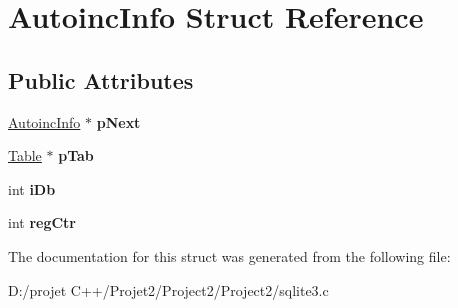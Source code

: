 \hypertarget{struct_autoinc_info}{}\section{Autoinc\+Info Struct Reference}
\label{struct_autoinc_info}
\subsection*{Public Attributes}
\begin{DoxyCompactItemize}
\item 
\mbox{\label{struct_autoinc_info_aa77fb076beea013c25df4e49dba4b6f6}} 
\mbox{\hyperlink{struct_autoinc_info}{Autoinc\+Info}} $\ast$ {\bfseries p\+Next}
\item 
\mbox{\label{struct_autoinc_info_a0cf785b0cbaddb4215a8408f8e13075e}} 
\mbox{\hyperlink{struct_table}{Table}} $\ast$ {\bfseries p\+Tab}
\item 
\mbox{\label{struct_autoinc_info_ae7234e0916b11ef97377bdfd6c7c4568}} 
int {\bfseries i\+Db}
\item 
\mbox{\label{struct_autoinc_info_af180977ee7dcc8cab862185692f57cc5}} 
int {\bfseries reg\+Ctr}
\end{DoxyCompactItemize}


The documentation for this struct was generated from the following file\+:\begin{DoxyCompactItemize}
\item 
D\+:/projet C++/\+Projet2/\+Project2/\+Project2/sqlite3.\+c\end{DoxyCompactItemize}
